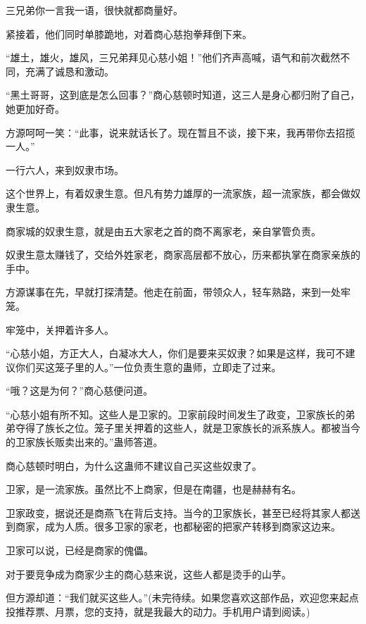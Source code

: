 \begin{this_body}
三兄弟你一言我一语，很快就都商量好。

紧接着，他们同时单膝跪地，对着商心慈抱拳拜倒下来。

“雄土，雄火，雄风，三兄弟拜见心慈小姐！”他们齐声高喊，语气和前次截然不同，充满了诚恳和激动。

“黑土哥哥，这到底是怎么回事？”商心慈顿时知道，这三人是身心都归附了自己，她更加好奇。

方源呵呵一笑：“此事，说来就话长了。现在暂且不谈，接下来，我再带你去招揽一人。”

一行六人，来到奴隶市场。

这个世界上，有着奴隶生意。但凡有势力雄厚的一流家族，超一流家族，都会做奴隶生意。

商家城的奴隶生意，就是由五大家老之首的商不离家老，亲自掌管负责。

奴隶生意太赚钱了，交给外姓家老，商家高层都不放心，历来都执掌在商家亲族的手中。

方源谋事在先，早就打探清楚。他走在前面，带领众人，轻车熟路，来到一处牢笼。

牢笼中，关押着许多人。

“心慈小姐，方正大人，白凝冰大人，你们是要来买奴隶？如果是这样，我可不建议你们买这笼子里的人。”一位负责生意的蛊师，立即走了过来。

“哦？这是为何？”商心慈便问道。

“心慈小姐有所不知。这些人是卫家的。卫家前段时间发生了政变，卫家族长的弟弟夺得了族长之位。笼子里关押着的这些人，就是卫家族长的派系族人。都被当今的卫家族长贩卖出来的。”蛊师答道。

商心慈顿时明白，为什么这蛊师不建议自己买这些奴隶了。

卫家，是一流家族。虽然比不上商家，但是在南疆，也是赫赫有名。

卫家政变，据说还是商燕飞在背后支持。当今的卫家族长，甚至已经将其家人都送到商家，成为人质。很多卫家的家老，也都秘密的把家产转移到商家这边来。

卫家可以说，已经是商家的傀儡。

对于要竞争成为商家少主的商心慈来说，这些人都是烫手的山芋。

但方源却道：“我们就买这些人。”(未完待续。如果您喜欢这部作品，欢迎您来起点投推荐票、月票，您的支持，就是我最大的动力。手机用户请到阅读。)

\end{this_body}

